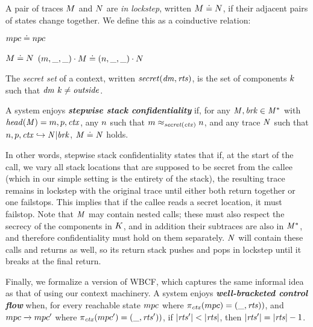 \documentclass[acmsmall,review,anonymous]{acmart}\settopmatter{printfolios=true,printccs=false,printacmref=false}
\begin{document}
{ A pair of traces \(M\) and \(N\) are {\em in lockstep},
written \(M \doteq N\),
if their adjacent pairs of states change together.  We define this as a coinductive relation:

\begin{minipage}{.3\textwidth}
\judgment{}
         {\(mpc \doteq npc\)}
\end{minipage}
\begin{minipage}{.6\textwidth}
\judgmenttwo{\(\mach, \pi_\mach(\head(\machT)) \diamond \nach, \pi_\mach(\head(\nachT))\)}
            {\(M \doteq N\)}
            {\((m,\mbox{\_},\mbox{\_}) \cdot M \doteq (n,\mbox{\_},\mbox{\_}) \cdot N\)}
\end{minipage}

The \emph{secret set} of a context, written \(\mathit{secret}(\mathit{dm},\mathit{rts})\), is the
set of components \(k\) such that \(\mathit{dm} ~ k \not = \mathit{outside}\).

A system enjoys \textbf{\textit{stepwise stack confidentiality}} if,
for any \(\mathit{M},\mathit{brk} \in \mathit{M}^*\) with \(\mathit{head}(\mathit{M}) = m,p,\mathit{ctx}\),
any \(n\) such that \(m \approx_{\mathit{secret}(\mathit{ctx})} n\), and any trace
\(\mathit{N}\) such that \(n,p,\mathit{ctx} \hookrightarrow \mathit{N} | \mathit{brk}\),
\(\mathit{M} \doteq \mathit{N}\) holds.


In other words, stepwise stack confidentiality states that if, at the start of the call,
we vary all stack locations that are supposed to be secret from the callee
(which in our simple setting is the entirety of the stack),
the resulting trace remains in lockstep with the original trace
until either both return together or one failstops. This implies that
if the callee reads a secret location, it must failstop.
%
Note that \(\mathit{M}\) may contain nested calls; these must also respect the secrecy
of the components in \(K\), and in addition their subtraces are also in
\(\mathit{M}^*\), and therefore confidentiality must hold on them separately. \(\mathit{N}\)
will contain these calls and returns as well, so its return stack pushes and pops
in lockstep until it breaks at the final return.

Finally, we formalize a version of WBCF, which captures the same informal idea
as that of \citet{SkorstengaardSTKJFP} using our context machinery.
A system enjoys \textit{\textbf{well-bracketed control flow}} when, for every reachable state
\(mpc\) where \(\pi_{\mathit{ctx}}(mpc) = (\mbox{\_},\mathit{rts}))\), and
\(mpc \xrightarrow{} mpc'\) where \(\pi_{\mathit{ctx}}(mpc') = (\mbox{\_},\mathit{rts}'))\),
if \(|\mathit{rts}'| < |\mathit{rts}|\), then \(|\mathit{rts}'| = |\mathit{rts}|-1\).

}
\end{document}
